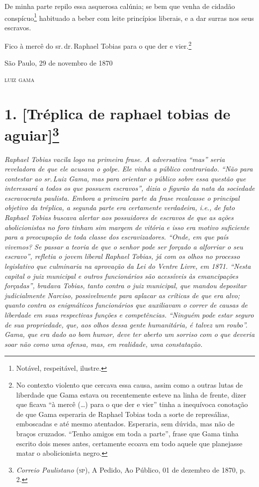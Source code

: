 De minha parte repilo essa asquerosa calúnia; se bem que venha de
cidadão conspícuo\footnote{ Notável, respeitável, ilustre.}
habituado a beber com leite princípios liberais, e a dar surras nos seus
escravos.

Fico à mercê do sr.\,dr.\,Raphael Tobias para o que der e vier.\footnote{
  No contexto violento que cercava essa causa, assim como a outras lutas
  de liberdade que Gama estava ou recentemente esteve na linha de
  frente, dizer que ficava ``à mercê (\ldots) para o que der e vier''
  tinha a inequívoca conotação de que Gama esperaria de Raphael Tobias
  toda a sorte de represálias, emboscadas e até mesmo atentados.
  Esperaria, sem dúvida, mas não de braços cruzados. ``Tenho amigos em
  toda a parte'', frase que Gama tinha escrito dois meses antes,
  certamente ecoava em todo aquele que planejasse matar o abolicionista
  negro.}

\begin{flushright}
São Paulo, 29 de novembro de 1870

\textsc{luiz gama}
\end{flushright}

\chapter{1. {[}Tréplica de raphael tobias de aguiar{]}\footnote{\emph{Correio Paulistano} (\textsc{sp}), A Pedido, Ao Público,
  01 de dezembro de 1870, p.\,2.}} %

\begin{didascalia}
\emph{Raphael Tobias vacila logo na primeira frase. A adversativa ``mas''
seria reveladora de que ele acusava o golpe. Ele vinha a público
contrariado. ``Não para contestar ao sr.\,Luiz Gama, mas para orientar o
público sobre essa questão que interessará a todos os que possuem
escravos'', dizia o figurão da nata da sociedade escravocrata paulista.
Embora a primeira parte da frase recalcasse o principal objetivo da
tréplica, a segunda parte era certamente verdadeira, i.e., de fato
Raphael Tobias buscava alertar aos possuidores de escravos de que as
ações abolicionistas no foro tinham sim margem de vitória e isso era
motivo suficiente para a preocupação de toda classe dos escravizadores.
``Onde, em que país vivemos? Se passar a teoria de que o senhor pode ser
forçado a alforriar o seu escravo'', refletia o jovem liberal Raphael
Tobias, já com os olhos no processo legislativo que culminaria na
aprovação da Lei do Ventre Livre, em 1871. ``Nesta capital o juiz
municipal e outros funcionários são acessíveis às emancipações
forçadas'', bradava Tobias, tanto contra o juiz municipal, que mandou
depositar judicialmente Narciso, possivelmente para aplacar as críticas
de que era alvo; quanto contra os enigmáticos funcionários que
auxiliavam o correr de causas de liberdade em suas respectivas funções e
competências. ``Ninguém pode estar seguro de sua propriedade, que, aos
olhos dessa gente humanitária, é talvez um roubo''. Gama, que era dado ao
bom humor, deve ter aberto um sorriso com o que deveria soar não como
uma ofensa, mas, em realidade, uma constatação.}
\end{didascalia}

